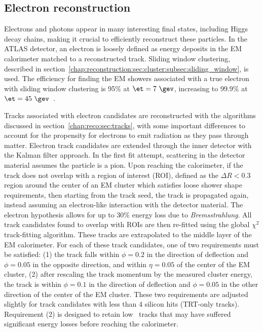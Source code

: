 
\subsection{Electron reconstruction}

Electrons and photons appear in many interesting final states,
including Higgs decay chains, making it crucial to efficiently
reconstruct these particles. In the ATLAS detector, an electron is
loosely defined as energy deposits in the EM calorimeter matched to a
reconstructed track. Sliding window clustering, described in
section~\ref{chap:reconstruction:sec:cluster:subsec:sliding_window},
is used. The efficiency for finding the EM showers associated with a
true electron with sliding window clustering is 95\% at $\et =
7~\gev$, increasing to 99.9\% at $\et =
45~\gev$~\cite{bib:ATLAS-CONF-2014-032}.

Tracks associated with electron candidates are reconstructed with the
algorithms discussed in section~\ref{chap:reco:sec:tracks}, with some
important differences to account for the propensity for electrons to
emit radiation as they pass through matter. Electron track candidates are extended
through the inner detector with the Kalman filter approach. In the
first fit attempt, scattering in the detector material assumes the
particle is a pion. Upon reaching the calorimeter, if the track does
not overlap with a region of interest (ROI), defined as the $\Delta{R}
< 0.3$ region around the center of an EM cluster which satisfies loose
shower shape requirements, then starting from the
track seed, the track is propagated again, instead assuming an
electron-like interaction with the detector material. The electron
hypothesis allows for up to 30\% energy loss due to {\it
  Bremsstrahlung}. All track candidates found to overlap with ROIs are
then re-fitted using the global $\chi^2$ track-fitting algorithm. These
tracks are extrapolated to the middle layer of the EM calorimeter. For
each of these track candidates, one of two requirements must be satisfied:
(1) the track falls within $\phi = 0.2$ in the direction of deflection
and $\phi = 0.05$ in the opposite direction, and within $\eta = 0.05$
of the center of the EM cluster, (2) after rescaling the track
momentum by the measured cluster energy, the track is within $\phi =
0.1$ in the direction of deflection and $\phi = 0.05$ in the other
direction of the center of the EM cluster. These two requirements are
adjusted slightly for track candidates with less than 4 silicon
hits (TRT-only tracks). Requirement (2) is designed to retain low \pt~tracks that may
have suffered significant energy losses before reaching the
calorimeter.

